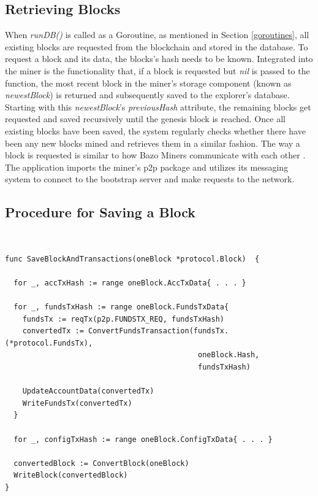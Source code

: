 \subsection{Retrieving Blocks} \label{retrieve}
When \emph{runDB()} is called as a Goroutine, as mentioned in Section \ref{goroutines}, all existing blocks are requested from the blockchain and stored in the database. To request a block and its data, the blocks's hash needs to be known. Integrated into the miner is the functionality that, if a block is requested but \emph{nil} is passed to the function, the most recent block in the miner's storage component (known as \emph{newestBlock}) is returned and subsequently saved to the explorer's database. Starting with this  \emph{newestBlock}'s \emph{previousHash} attribute, the remaining blocks get requested and saved recursively until the genesis block is reached. Once all existing blocks have been saved, the system regularly checks whether there have been any new blocks mined and retrieves them in a similar fashion.
The way a block is requested is similar to how Bazo Miners communicate with each other \cite{bazo}. The application imports the miner's p2p package and utilizes its messaging system to connect to the bootstrap server and make requests to the network.

\subsection{Procedure for Saving a Block} \

\begin{lstlisting}[caption={Saving a Block and Its Transactions to the Database},captionpos=b,label={lst:save}]
func SaveBlockAndTransactions(oneBlock *protocol.Block)  {

  for _, accTxHash := range oneBlock.AccTxData{ . . . }

  for _, fundsTxHash := range oneBlock.FundsTxData{
    fundsTx := reqTx(p2p.FUNDSTX_REQ, fundsTxHash)
    convertedTx := ConvertFundsTransaction(fundsTx.(*protocol.FundsTx), 
    										oneBlock.Hash, 
											fundsTxHash)

    UpdateAccountData(convertedTx)
    WriteFundsTx(convertedTx)
  }

  for _, configTxHash := range oneBlock.ConfigTxData{ . . . }

  convertedBlock := ConvertBlock(oneBlock)
  WriteBlock(convertedBlock)
}
\end{lstlisting}

